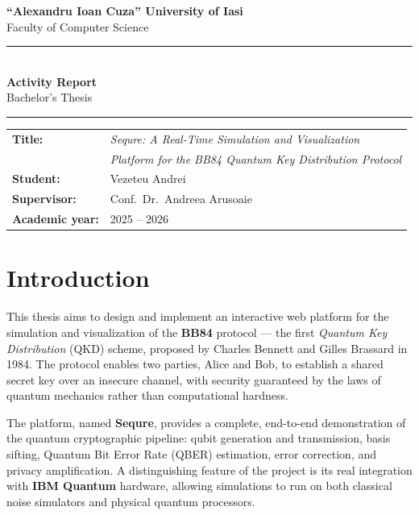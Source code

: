 \documentclass[12pt, a4paper]{article}
\begin{document}
\begin{center}
  {\large \textbf{``Alexandru Ioan Cuza'' University of Iasi}} \\[4pt]
  {\normalsize Faculty of Computer Science} \\[16pt]

  \rule{\linewidth}{0.5pt} \\[10pt]

  {\LARGE \textbf{Activity Report}} \\[6pt]
  {\large Bachelor's Thesis} \\[16pt]

  \rule{\linewidth}{0.5pt}
\end{center}

\vspace{10pt}

\begin{tabular}{@{}ll}
  \textbf{Title:}            & \textit{Sequre: A Real-Time Simulation and Visualization} \\
                             & \textit{Platform for the BB84 Quantum Key Distribution Protocol} \\[4pt]
  \textbf{Student:}          & Vezeteu Andrei \\[4pt]
  \textbf{Supervisor:}       & Conf.\ Dr.\ Andreea Arusoaie \\[4pt]
  \textbf{Academic year:}    & 2025 -- 2026 \\
\end{tabular}

\vspace{16pt}

\section{Introduction}

This thesis aims to design and implement an interactive web platform for the
simulation and visualization of the \textbf{BB84} protocol --- the first
\textit{Quantum Key Distribution} (QKD) scheme, proposed by Charles Bennett
and Gilles Brassard in 1984. The protocol enables two parties, Alice and Bob,
to establish a shared secret key over an insecure channel, with security
guaranteed by the laws of quantum mechanics rather than computational hardness.

The platform, named \textbf{Sequre}, provides a complete, end-to-end
demonstration of the quantum cryptographic pipeline: qubit generation and
transmission, basis sifting, Quantum Bit Error Rate (QBER) estimation, error
correction, and privacy amplification. A distinguishing feature of the project
is its real integration with \textbf{IBM Quantum} hardware, allowing simulations
to run on both classical noise simulators and physical quantum processors.
      
\end{document}
